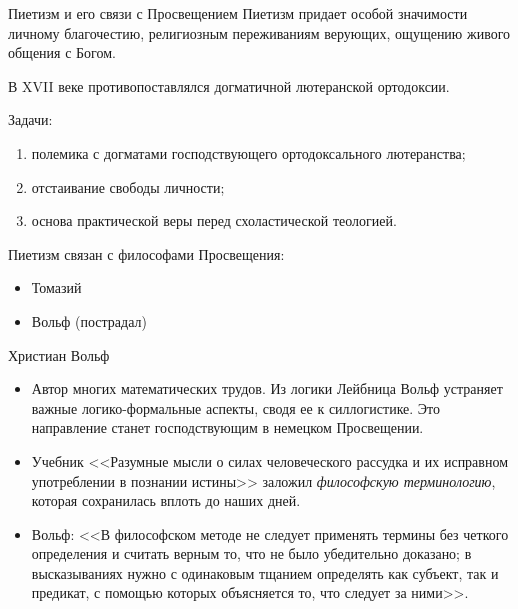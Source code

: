 \documentclass{beamer}
\begin{document}
    \begin{frame}{Пиетизм и его связи с Просвещением}
        Пиетизм придает особой значимости личному благочестию,
        религиозным переживаниям верующих, ощущению живого общения с Богом.

        В XVII веке противопоставлялся догматичной лютеранской ортодоксии.

        Задачи:
        \begin{enumerate}
        \item полемика с догматами господствующего ортодоксального лютеранства;
        \item отстаивание свободы личности;
        \item основа практической веры перед схоластической теологией.
        \end{enumerate}

        Пиетизм связан с философами Просвещения:
        \begin{itemize}
        \item Томазий
        \item Вольф (пострадал)
        \end{itemize}
    \end{frame}

    \begin{frame}{Христиан Вольф}
        \begin{itemize}
        \item Автор многих математических трудов.
            Из логики Лейбница Вольф устраняет важные логико-формальные аспекты,
            сводя ее к силлогистике.
            Это направление станет господствующим в немецком Просвещении.
        \item Учебник <<Разумные мысли о силах человеческого рассудка и
            их исправном употреблении в познании истины>> заложил
            \emph{философскую терминологию}, которая сохранилась
            вплоть до наших дней.
        \item Вольф: <<В философском методе не следует применять термины
            без четкого определения и считать верным то,
            что не было убедительно доказано;
            в высказываниях нужно с одинаковым тщанием определять как субъект,
            так и предикат, с помощью которых объясняется то,
            что следует за ними>>.
        \end{itemize}
    \end{frame}
\end{document}
